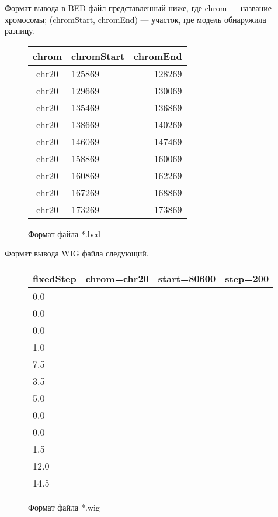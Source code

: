 \documentclass{matmex-diploma-custom}
\begin{document}
\newpage
Формат вывода в BED файл представленный ниже, где chrom --- название хромосомы; (chromStart, chromEnd) --- участок, где модель обнаружила разницу.
\begin{figure}[h]
\label{bed1}
\begin{center}
  \begin{tabular}{ | c | l | r |}
    \hline
    chrom & chromStart & chromEnd \\ \hline
    chr20 & 125869 & 128269 \\ 
    chr20 & 129669 & 130069 \\
    chr20 & 135469 & 136869 \\
    chr20 & 138669 & 140269 \\
    chr20 & 146069 & 147469 \\
    chr20 & 158869 & 160069 \\
    chr20 & 160869 & 162269 \\
    chr20 & 167269 & 168869 \\
    chr20 & 173269 & 173869 \\
    \hline
  \end{tabular}
\end{center}
\caption{Формат файла *.bed}
\end{figure}

Формат вывода WIG файла следующий.
\begin{figure}[h]
\label{wig1}
\begin{center}
  \begin{tabular}{ | c | c | c | r |}
    \hline
    fixedStep & chrom=chr20 & start=80600 & step=200 \\ \hline
    \multicolumn{4}{|l|}{0.0} \\ 
    \multicolumn{4}{|l|}{0.0} \\
    \multicolumn{4}{|l|}{0.0} \\
    \multicolumn{4}{|l|}{1.0} \\
    \multicolumn{4}{|l|}{7.5} \\
    \multicolumn{4}{|l|}{3.5} \\
    \multicolumn{4}{|l|}{5.0} \\
    \multicolumn{4}{|l|}{0.0} \\
    \multicolumn{4}{|l|}{0.0} \\
    \multicolumn{4}{|l|}{1.5} \\
    \multicolumn{4}{|l|}{12.0} \\
    \multicolumn{4}{|l|}{14.5} \\
    \hline
  \end{tabular}
\end{center}
\caption{Формат файла *.wig}
\end{figure}
\end{document}
